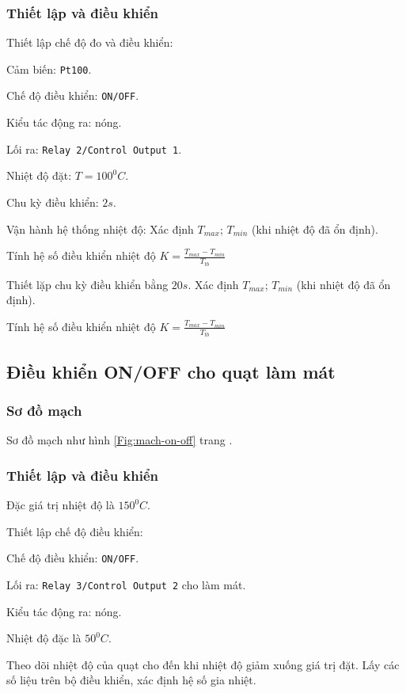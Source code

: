 \documentclass[13pt,a4paper]{extarticle}
\begin{document}
\subsubsection{Thiết lập và điều khiển}
\begin{list}{--}{}
\item Thiết lập chế độ đo và điều khiển:
\begin{list}{+}{}
\item Cảm biến: \verb|Pt100|.
\item Chế độ điều khiển: \verb|ON/OFF|.
\item Kiểu tác động ra: nóng.
\item Lối ra: \verb|Relay 2/Control Output 1|.
\item Nhiệt độ đặt: $T= 100^0C$.
\item Chu kỳ điều khiển: $2s$.
\end{list}
\item Vận hành hệ thống nhiệt độ: Xác định $T_{max}$; $T_{min}$ (khi nhiệt độ đã ổn định).

Tính hệ số điều khiển nhiệt độ $\displaystyle K = \frac{T_{max}-T_{min}}{T_{tb}}$
\item Thiết lặp chu kỳ điều khiển bằng $20s$. Xác định $T_{max}$; $T_{min}$ (khi nhiệt độ đã ổn định).

Tính hệ số điều khiển nhiệt độ $\displaystyle K = \frac{T_{max}-T_{min}}{T_{tb}}$
\end{list}
\subsection{Điều khiển ON/OFF cho quạt làm mát}
\subsubsection{Sơ đồ mạch}
Sơ đồ mạch như hình \ref{Fig:mach-on-off} trang \pageref{Fig:mach-on-off}.
\subsubsection{Thiết lập và điều khiển}
\begin{list}{--}{}
\item Đặc giá trị nhiệt độ là $150^0C$.
\item Thiết lập chế độ điều khiển:
\begin{list}{+}{}
\item Chế độ điều khiển: \verb|ON/OFF|.
\item Lối ra: \verb|Relay 3/Control Output 2| cho làm mát.
\item Kiểu tác động ra: nóng.
\item Nhiệt độ đặc là $50^0C$.
\end{list}
\item Theo dõi nhiệt độ của quạt cho đến khi nhiệt độ giảm xuống giá trị đặt. Lấy các số liệu trên bộ điều khiển, xác định hệ số gia nhiệt.
\end{list}
\end{document}
